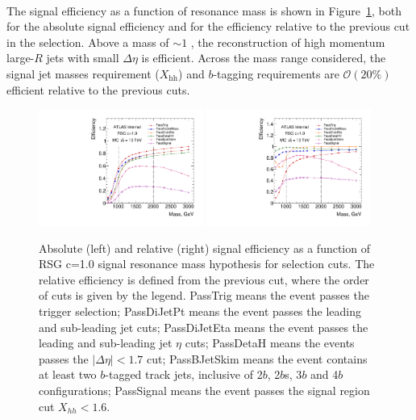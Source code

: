 \paragraph{}
The signal efficiency as a function of \Grav resonance mass is shown in Figure~\ref{fig:boosted-selection-efficiency}, both for the absolute signal efficiency and for the efficiency relative to the previous cut in the selection. 
Above a mass of $\sim\!1$ \TeV, the reconstruction of high momentum large-$R$ jets with small $\Delta\eta$ is efficient. 
Across the mass range considered, the signal jet masses requirement ($X_\text{hh}$) and $b$-tagging requirements are $\mathcal{O}(20\%)$ efficient relative to the previous cuts. 

\begin{figure}
\begin{center}
\includegraphics[width=0.48\textwidth,angle=-90]{figures/boosted/SigEff/evtsel_Moriond_Efficiency_PreSel.pdf}
\includegraphics[width=0.48\textwidth,angle=-90]{figures/boosted/SigEff/evtsel_Moriond_Efficiency_PreSel_rel.pdf}
  \caption{Absolute (left) and relative (right) signal efficiency as a function of RSG c=1.0 signal resonance mass hypothesis for selection cuts. The relative efficiency is defined from the previous cut, where the order of cuts is given by the legend. PassTrig means the event passes the trigger selection; PassDiJetPt means the event passes the leading and sub-leading jet \pt cuts; PassDiJetEta means the event passes the leading and sub-leading jet $\eta$ cuts; PassDetaH means the events passes the $|\Delta \eta| < 1.7$ cut; PassBJetSkim means the event contains at least two $b$-tagged track jets, inclusive of 2$b$, 2$b$s, 3$b$ and 4$b$ configurations; PassSignal means the event passes the signal region cut $X_{hh} < 1.6$.}
  \label{fig:boosted-selection-efficiency}
\end{center}
\end{figure}

